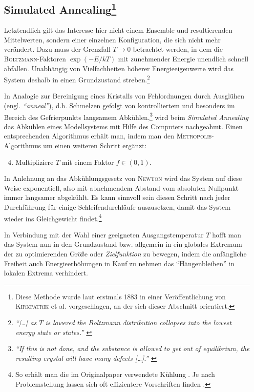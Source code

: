 \documentclass[a4paper, 10pt, twoside, openany]{book} %
\begin{document}
	\subsection[Simulated Annealing]{Simulated Annealing\footnote{Diese Methode wurde laut \cite[Einleitung]{vanLaarhoven} erstmals 1883 in einer Veröffentlichung von \textsc{Kirkpatrik} et al. \cite{Kirkpatrick} vorgeschlagen, an der sich dieser Abschnitt orientiert.}}
	
	Letztendlich gilt das Interesse hier nicht einem Ensemble und resultierenden Mittelwerten, sondern einer einzelnen Konfiguration, die sich nicht mehr verändert. Dazu muss der Grenzfall $T \rightarrow 0$ betrachtet werden, in dem die \textsc{Boltzmann}-Faktoren $\exp(-E / k T)$ mit zunehmender Energie unendlich schnell abfallen. Unabhängig von Vielfachheiten höherer Energieeigenwerte wird das System deshalb in einen Grundzustand streben.\footnote{\emph{"`\emph{[\dots]} as $T$ is lowered the Boltzmann distribution collapses into the lowest energy state or states."' \cite[S.~672]{Kirkpatrick}}}
	
	In Analogie zur Bereinigung eines Kristalls von Fehlordnungen durch Ausglühen (engl. \emph{"`anneal"'}), d.h. Schmelzen gefolgt von kontrolliertem und besonders im Bereich des Gefrierpunkts langsamem Abkühlen,\footnote{\emph{"`If this is not done, and the substance is allowed to get out of equilibrium, the resulting crystal will have many defects \emph{[\dots]}."' \cite[S.~672]{Kirkpatrick}}} wird beim \emph{Simulated Annealing} das Abkühlen eines Modellsystems mit Hilfe des Computers nachgeahmt. Einen entsprechenden Algorithmus erhält man, indem man den \textsc{Metropolis}-Algorithmus um einen weiteren Schritt ergänzt:
	\begin{enumerate}
	    \setcounter{enumi}{3}
		\item Multipliziere $T$ mit einem Faktor $f \in (0, 1)$.
	\end{enumerate}
	In Anlehnung an das Abkühlungsgesetz von \textsc{Newton} wird das System auf diese Weise exponentiell, also mit abnehmendem Abstand vom absoluten Nullpunkt immer langsamer abgekühlt. Es kann sinnvoll sein diesen Schritt nach jeder Durchführung für einige Schleifendurchläufe auszusetzen, damit das System wieder ins Gleichgewicht findet.\footnote{So erhält man die im Originalpaper verwendete Kühlung \cite[S.~675]{Kirkpatrick}. Je nach Problemstellung lassen sich oft effizientere Vorschriften finden \cite[S.~59f]{vanLaarhoven}.}
	
	In Verbindung mit der Wahl einer geeigneten Ausgangstemperatur $T$ hofft man das System nun in den Grundzustand bzw. allgemein in ein globales Extremum der zu optimierenden Größe oder \emph{Zielfunktion} zu bewegen, indem die anfängliche Freiheit auch Energieerhöhungen in Kauf zu nehmen das "`Hängenbleiben"' in lokalen Extrema verhindert.
	
\end{document}

